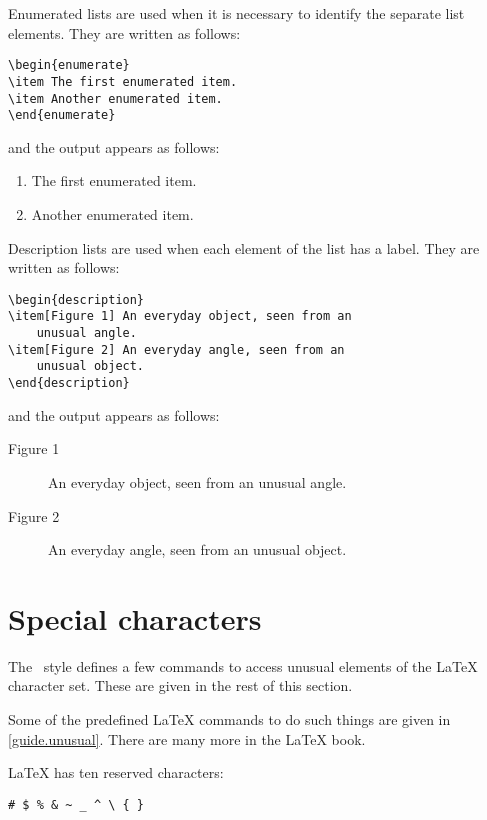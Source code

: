 Enumerated lists are used when it is necessary to identify the separate
list elements.
They are written as follows:
\begin{verbatim}
\begin{enumerate}
\item The first enumerated item.
\item Another enumerated item.
\end{enumerate}
\end{verbatim}
and the output appears as follows:
\begin{enumerate}
\item The first enumerated item.
\item Another enumerated item.
\end{enumerate}

Description lists are used when each element of the list has a label.
They are written as follows:
\begin{verbatim}
\begin{description}
\item[Figure 1] An everyday object, seen from an
    unusual angle.
\item[Figure 2] An everyday angle, seen from an
    unusual object.
\end{description}
\end{verbatim}
and the output appears as follows:
\begin{description}
\item[Figure 1] An everyday object, seen from an
    unusual angle.
\item[Figure 2] An everyday angle, seen from an
    unusual object.
\end{description}

\section{Special characters}
\label{specialchars}
The \iso\ style defines a few commands to access unusual elements of the
LaTeX character set.
These are given in the rest of this section.

Some of the predefined LaTeX commands to do such things are given in
\ref{guide.unusual}.
There are many more in the LaTeX book.

\label{specialchars.reserved}
LaTeX has ten reserved characters:
\begin{verbatim}
# $ % & ~ _ ^ \ { }
\end{verbatim}

